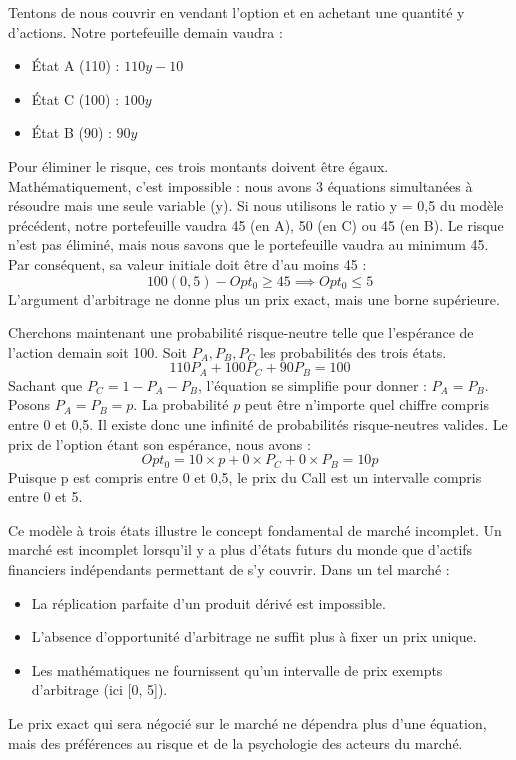 Tentons de nous couvrir en vendant l'option et en achetant une quantité y d'actions. Notre portefeuille demain vaudra :
\begin{itemize}[label=$\cdot$]
    \item État A (110) : $110y - 10$
    \item État C (100) : $100y$
    \item État B (90) : $90y$
\end{itemize}
Pour éliminer le risque, ces trois montants doivent être égaux. Mathématiquement, c'est impossible : nous avons 3 équations simultanées à résoudre mais une seule variable (y).
Si nous utilisons le ratio y = 0,5 du modèle précédent, notre portefeuille vaudra 45 (en A), 50 (en C) ou 45 (en B). Le risque n'est pas éliminé, mais nous savons que le portefeuille vaudra au minimum 45. Par conséquent, sa valeur initiale doit être d'au moins 45 :
\begin{equation}
    \label{eq:fsec3-borne_incomplet}
    100(0,5) - Opt_0 \ge 45 \implies Opt_0 \le 5
\end{equation}
L'argument d'arbitrage ne donne plus un prix exact, mais une borne supérieure.

Cherchons maintenant une probabilité risque-neutre telle que l'espérance de l'action demain soit 100.
Soit $P_A, P_B, P_C$ les probabilités des trois états.
\begin{equation}
    \label{eq:fsec3-esperance_incomplet}
    110 P_A + 100 P_C + 90 P_B = 100
\end{equation}
Sachant que $P_C = 1 - P_A - P_B$, l'équation se simplifie pour donner : $P_A = P_B$.
Posons $P_A = P_B = p$. La probabilité $p$ peut être n'importe quel chiffre compris entre 0 et 0,5. Il existe donc une infinité de probabilités risque-neutres valides.
Le prix de l'option étant son espérance, nous avons :
\begin{equation}
    \label{eq:fsec3-opt_incomplet}
    Opt_0 = 10 \times p + 0 \times P_C + 0 \times P_B = 10p
\end{equation}
Puisque p est compris entre 0 et 0,5, le prix du Call est un intervalle compris entre 0 et 5.

Ce modèle à trois états illustre le concept fondamental de marché incomplet. Un marché est incomplet lorsqu'il y a plus d'états futurs du monde que d'actifs financiers indépendants permettant de s'y couvrir. Dans un tel marché :
\begin{itemize}[label=$\rightarrow$]
    \item La réplication parfaite d'un produit dérivé est impossible.
    \item L'absence d'opportunité d'arbitrage ne suffit plus à fixer un prix unique.
    \item Les mathématiques ne fournissent qu'un intervalle de prix exempts d'arbitrage (ici [0, 5]).
\end{itemize}
Le prix exact qui sera négocié sur le marché ne dépendra plus d'une équation, mais des préférences au risque et de la psychologie des acteurs du marché.

